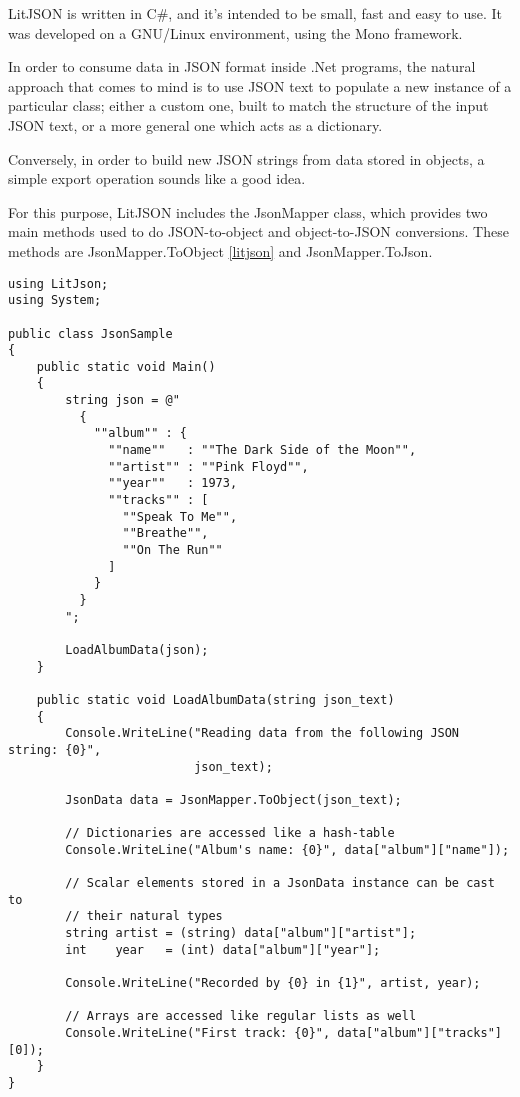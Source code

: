 {LitJSON is written in C\#, and it’s intended to be small, fast and easy to use. It was developed on a GNU/Linux environment, using the Mono framework.

In order to consume data in JSON format inside .Net programs, the natural approach that comes to mind is to use JSON text to populate a new instance of a particular class; either a custom one, built to match the structure of the input JSON text, or a more general one which acts as a dictionary.

Conversely, in order to build new JSON strings from data stored in objects, a simple export operation sounds like a good idea.

For this purpose, LitJSON includes the JsonMapper class, which provides two main methods used to do JSON-to-object   and object-to-JSON conversions. These methods are JsonMapper.ToObject  \autoref{litjson} and JsonMapper.ToJson.
\begin{lstlisting}[caption={LitJson usage example in C\# \cite{lit}.},label={litjson}]
using LitJson;
using System;

public class JsonSample
{
    public static void Main()
    {
        string json = @"
          {
            ""album"" : {
              ""name""   : ""The Dark Side of the Moon"",
              ""artist"" : ""Pink Floyd"",
              ""year""   : 1973,
              ""tracks"" : [
                ""Speak To Me"",
                ""Breathe"",
                ""On The Run""
              ]
            }
          }
        ";

        LoadAlbumData(json);
    }

    public static void LoadAlbumData(string json_text)
    {
        Console.WriteLine("Reading data from the following JSON string: {0}",
                          json_text);

        JsonData data = JsonMapper.ToObject(json_text);

        // Dictionaries are accessed like a hash-table
        Console.WriteLine("Album's name: {0}", data["album"]["name"]);

        // Scalar elements stored in a JsonData instance can be cast to
        // their natural types
        string artist = (string) data["album"]["artist"];
        int    year   = (int) data["album"]["year"];

        Console.WriteLine("Recorded by {0} in {1}", artist, year);

        // Arrays are accessed like regular lists as well
        Console.WriteLine("First track: {0}", data["album"]["tracks"][0]);
    }
}
\end{lstlisting}

}
